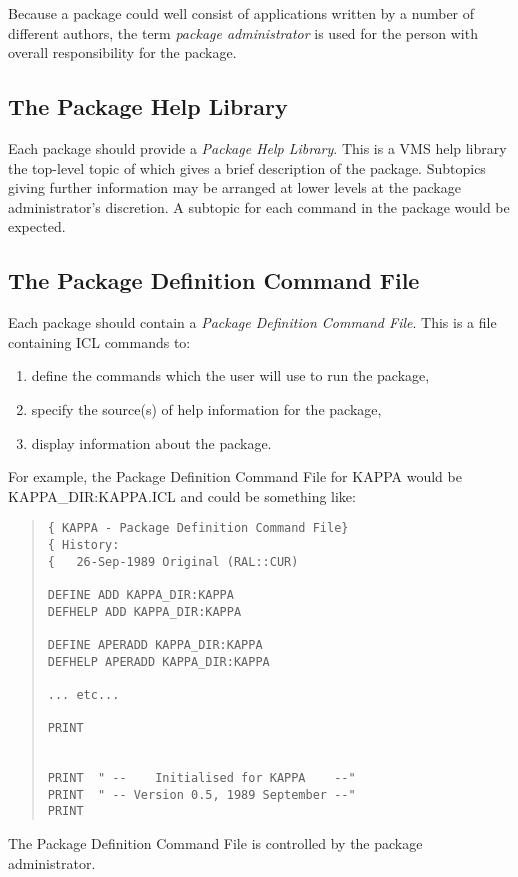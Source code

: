Because a package could well consist of applications written by a number of
different authors, the term {\em package administrator} is used for the
person with overall responsibility for the package.

\subsection{The Package Help Library}
Each package should provide a {\em Package Help Library}.
This is a VMS help library the top-level topic of which gives a brief 
description of the package.
Subtopics giving further information may be arranged at lower levels at the 
package administrator's discretion.
A subtopic for each command in the package would be expected.

\subsection{The Package Definition Command File}
Each package should contain a {\em Package Definition Command File}.
This is a file containing ICL commands to:
\begin{enumerate}
\item define the commands which the user will use to run the package,
\item specify the source(s) of help information for the package,
\item display information about the package.
\end{enumerate}
 
For example, the Package Definition Command File for KAPPA would be
KAPPA\_DIR:\-KAPPA\-.ICL and could be something like:
\begin{quote}
\begin{verbatim}
{ KAPPA - Package Definition Command File}
{ History:
{   26-Sep-1989 Original (RAL::CUR)

DEFINE ADD KAPPA_DIR:KAPPA
DEFHELP ADD KAPPA_DIR:KAPPA

DEFINE APERADD KAPPA_DIR:KAPPA
DEFHELP APERADD KAPPA_DIR:KAPPA

... etc...

PRINT


PRINT  " --    Initialised for KAPPA    --"
PRINT  " -- Version 0.5, 1989 September --"
PRINT
\end{verbatim}
\end{quote}

The Package Definition Command File is controlled by the package administrator.

